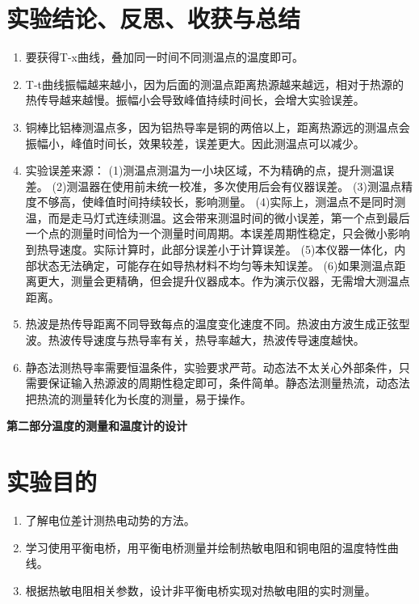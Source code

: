 \documentclass[11pt]{article}
\begin{document}
\section{实验结论、反思、收获与总结}
\begin{enumerate}
    \item 要获得T-x曲线，叠加同一时间不同测温点的温度即可。
    \item T-t曲线振幅越来越小，因为后面的测温点距离热源越来越远，相对于热源的热传导越来越慢。振幅小会导致峰值持续时间长，会增大实验误差。
    \item 铜棒比铝棒测温点多，因为铝热导率是铜的两倍以上，距离热源远的测温点会振幅小，峰值时间长，效果较差，误差更大。因此测温点可以减少。
    \item 实验误差来源：
    \newline (1)测温点测温为一小块区域，不为精确的点，提升测温误差。
    \newline (2)测温器在使用前未统一校准，多次使用后会有仪器误差。
    \newline (3)测温点精度不够高，使峰值时间持续较长，影响测量。
    \newline (4)实际上，测温点不是同时测温，而是走马灯式连续测温。这会带来测温时间的微小误差，第一个点到最后一个点的测量时间恰为一个测量时间周期。本误差周期性稳定，只会微小影响到热导速度。实际计算时，此部分误差小于计算误差。
    \newline (5)本仪器一体化，内部状态无法确定，可能存在如导热材料不均匀等未知误差。
    \newline (6)如果测温点距离更大，测量会更精确，但会提升仪器成本。作为演示仪器，无需增大测温点距离。
    \item 热波是热传导距离不同导致每点的温度变化速度不同。热波由方波生成正弦型波。热波传导速度与热导率有关，热导率越大，热波传导速度越快。
    \item 静态法测热导率需要恒温条件，实验要求严苛。动态法不太关心外部条件，只需要保证输入热源波的周期性稳定即可，条件简单。静态法测量热流，动态法把热流的测量转化为长度的测量，易于操作。
    
\end{enumerate}


\begin{center}
    \vspace*{1em}
    \Large \bf 第二部分\qquad 温度的测量和温度计的设计
\end{center}
\setcounter{section}{0}
\section{实验目的}
\begin{enumerate}
    \item 了解电位差计测热电动势的方法。
    \item 学习使用平衡电桥，用平衡电桥测量并绘制热敏电阻和铜电阻的温度特性曲线。
    \item 根据热敏电阻相关参数，设计非平衡电桥实现对热敏电阻的实时测量。
\end{enumerate}
\end{document}
